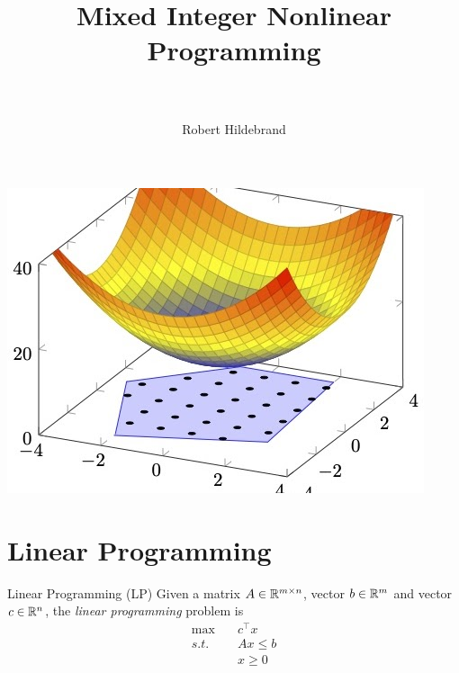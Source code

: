 \documentclass{article}
\author{Robert Hildebrand}
\affil{Durham 223 \quad rhil@vt.edu \\ \url{https://sites.google.com/site/robertdhildebrand/}}
\title{Mixed Integer Nonlinear Programming\\ 
\tblue{Theory and Applications}\\}
\date{}
\begin{document}
\maketitle
\begin{center}
\includegraphics[scale = 0.3]{presentation_figures/minlp}
\end{center}
\newpage
{
\renewcommand{\contentsname}{Outline}
\hypersetup{hidelinks}
\tableofcontents
}
\newpage
\section{Linear Programming}
\begin{general}{Linear Programming (LP)}{\polynomial}
Given a matrix $A \in \mathbb{R}^{m\times n}$, vector $b \in \mathbb{R}^m$ and vector $c \in \mathbb{R}^n$, the \emph{linear programming} problem is
\begin{equation}
\label{eq:LP}
\begin{split}
\max \quad & c^\top x\\
s.t.  \quad & Ax \leq b\\
& x \geq 0
\end{split}
\end{equation}
\end{general}
\vspace{-0.8cm}
\end{document}
